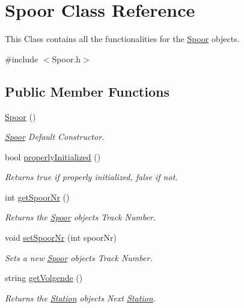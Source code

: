 \hypertarget{classSpoor}{}\section{Spoor Class Reference}
\label{classSpoor}


This Class contains all the functionalities for the \hyperlink{classSpoor}{Spoor} objects.  




{\ttfamily \#include $<$Spoor.\+h$>$}

\subsection*{Public Member Functions}
\begin{DoxyCompactItemize}
\item 
\hyperlink{classSpoor_a64778a4094d2d9cd3a08cbbef5a11787}{Spoor} ()
\begin{DoxyCompactList}\small\item\em \hyperlink{classSpoor}{Spoor} Default Constructor. \end{DoxyCompactList}\item 
bool \hyperlink{classSpoor_a31982084b33e5946f1e15844b084f62f}{properly\+Initialized} ()
\begin{DoxyCompactList}\small\item\em Returns true if properly initialized, false if not. \end{DoxyCompactList}\item 
int \hyperlink{classSpoor_a17c71f600581bc91b85c92d6628d14c5}{get\+Spoor\+Nr} ()
\begin{DoxyCompactList}\small\item\em Returns the \hyperlink{classSpoor}{Spoor} object\textquotesingle{}s Track Number. \end{DoxyCompactList}\item 
void \hyperlink{classSpoor_af0c947d95aafed41f4fa3c5ec96d2e3c}{set\+Spoor\+Nr} (int spoor\+Nr)
\begin{DoxyCompactList}\small\item\em Sets a new \hyperlink{classSpoor}{Spoor} object\textquotesingle{}s Track Number. \end{DoxyCompactList}\item 
string \hyperlink{classSpoor_af72fa63d73e10bb5d0bb0e15958260d5}{get\+Volgende} ()
\begin{DoxyCompactList}\small\item\em Returns the \hyperlink{classStation}{Station} object\textquotesingle{}s Next \hyperlink{classStation}{Station}. \end{DoxyCompactList}\item 

\end{DoxyCompactItemize}
